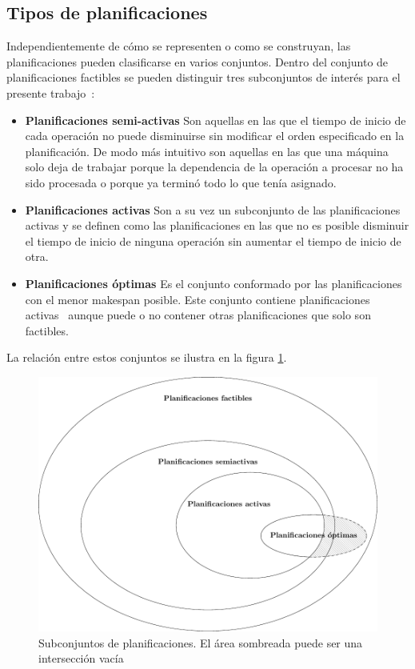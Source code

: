 \subsection{Tipos de planificaciones}
Independientemente de cómo se representen o como se construyan, las planificaciones pueden clasificarse en varios conjuntos. Dentro del conjunto de planificaciones factibles se pueden distinguir tres subconjuntos de interés para el presente trabajo~\cite{sprecher1995semi}:
\begin{itemize}
    \item \textbf{Planificaciones semi-activas} Son aquellas en las que el tiempo de inicio de cada operación no puede disminuirse sin modificar el orden especificado en la planificación. De modo más intuitivo son aquellas en las que una máquina solo deja de trabajar porque la dependencia de la operación a procesar no ha sido procesada o porque ya terminó todo lo que tenía asignado.
    \item \textbf{Planificaciones activas} Son a su vez un subconjunto de las planificaciones activas y se definen como las planificaciones en las que no es posible disminuir el tiempo de inicio de ninguna operación sin aumentar el tiempo de inicio de otra. 
    \item \textbf{Planificaciones óptimas} Es el conjunto conformado por las planificaciones con el menor makespan posible. Este conjunto contiene planificaciones activas~\cite{Ponsich2013} aunque puede o no contener otras planificaciones que solo son factibles.
\end{itemize}

La relación entre estos conjuntos se ilustra en la figura \ref{fig:solspace}. 


\begin{figure}[H]
    \centering
    \includegraphics[scale=.8]{Imagenes/solspace.pdf}
    \caption{Subconjuntos de planificaciones. El área sombreada puede ser una intersección vacía}
    \label{fig:solspace}
\end{figure}

